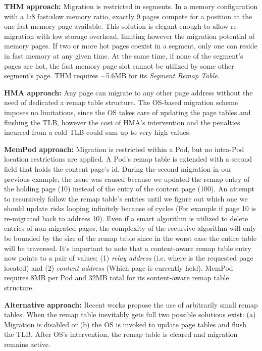 	\textbf{THM approach:} Migration is restricted in segments. In a memory configuration with a 1:8 fast:slow memory ratio, exactly 9 pages compete for a position at the one fast memory page available. This solution is elegant enough to allow re-migration with low storage overhead, limiting however the migration potential of memory pages. If two or more hot pages coexist in a segment, only one can reside in fast memory at any given time. At the same time, if none of the segment's pages are hot, the fast memory page slot cannot be utilized by some other segment's page. THM requires $\sim$5.6MB for its \textit{Segment Remap Table}.

	\textbf{HMA approach:} Any page can migrate to any other page address without the need of dedicated a remap table structure. The OS-based migration scheme imposes no limitations, since the OS takes care of updating the page tables and flushing the TLB, however the cost of HMA's intervention and the penalties incurred from a cold TLB could sum up to very high values.

	\textbf{MemPod approach:} Migration is restricted within a Pod, but no intra-Pod location restrictions are applied. A Pod's remap table is extended with a second field that holds the content page's id. During the second migration in our previous example, the issue was caused because we updated the remap entry of the holding page (10) instead of the entry of the content page (100). An attempt to recursively follow the remap table's entries until we figure out which one we should update risks looping infinitely because of cycles (For example if page 10 is re-migrated back to address 10). Even if a smart algorithm is utilized to delete entries of non-migrated pages, the complexity of the recursive algorithm will only be bounded by the size of the remap table since in the worst case the entire table will be traversed. It's important to note that a content-aware remap table entry now points to a pair of values: (1) \textit{relay address} (i.e. where is the requested page located) and (2) \textit{content address} (Which page is currently held). MemPod requires 8MB per Pod and 32MB total for its sontent-aware remap table structure.

	\textbf{Alternative approach:} Recent works propose the use of arbitrarily small remap tables. When the remap table inevitably gets full two possible solutions exist: (a) Migration is disabled or (b) the OS is invoked to update page tables and flush the TLB. After OS's intervention, the remap table is cleared and migration remains active.

